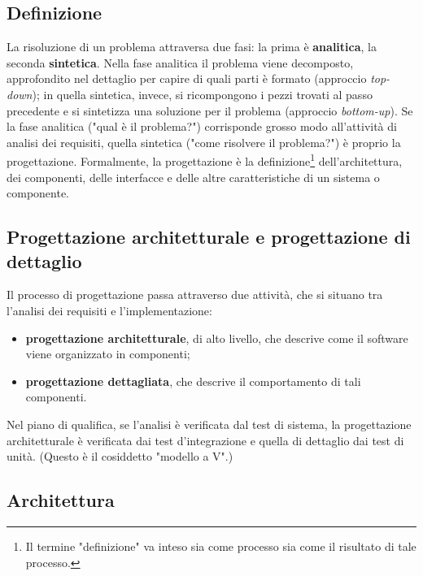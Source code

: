 \documentclass[a4paper]{article}
\begin{document}
		
	\subsection{Definizione}

		
La risoluzione di un problema attraversa due fasi: la prima è \textbf{analitica}, la seconda \textbf{sintetica}. Nella fase analitica il problema viene decomposto, approfondito nel dettaglio per capire di quali parti è formato (approccio \emph{top-down}); in quella sintetica, invece, si ricompongono i pezzi trovati al passo precedente e si sintetizza una soluzione per il problema (approccio \emph{bottom-up}). Se la fase analitica ("qual è il problema?") corrisponde grosso modo all'attività di analisi dei requisiti, quella sintetica ("come risolvere il problema?") è proprio la progettazione. Formalmente, la progettazione è la definizione\footnote{Il termine "definizione" va inteso sia come processo sia come il risultato di tale processo.} dell'architettura, dei componenti, delle interfacce e delle altre caratteristiche di un sistema o componente.

		
	\subsection{Progettazione architetturale e progettazione di dettaglio}

		
Il processo di progettazione passa attraverso due attività, che si situano tra l'analisi dei requisiti e l'implementazione:
		
	\begin{itemize}
		
			
	\item \textbf{progettazione architetturale}, di alto livello, che descrive come il software viene organizzato in componenti;
			
	\item \textbf{progettazione dettagliata}, che descrive il comportamento di tali componenti.
		
	\end{itemize}

		
Nel piano di qualifica, se l'analisi è verificata dal test di sistema, la progettazione architetturale è verificata dai test d'integrazione e quella di dettaglio dai test di unità. (Questo è il cosiddetto "modello a V".)

		
	\subsection{Architettura}
\end{document}
